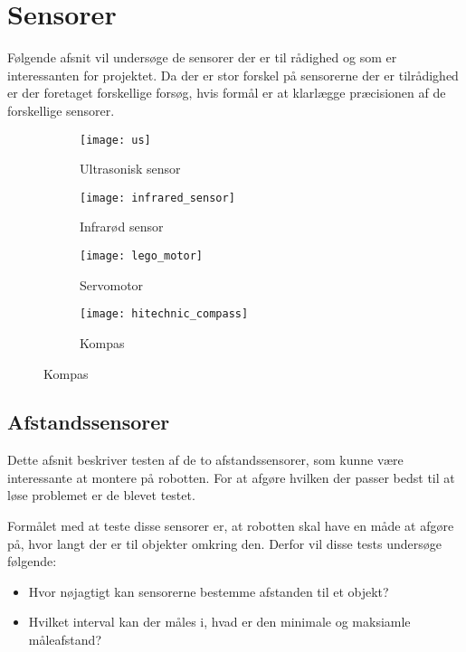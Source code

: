 \section{Sensorer}
Følgende afsnit vil undersøge de sensorer der er til rådighed og som er interessanten for projektet.
Da der er stor forskel på sensorerne der er tilrådighed er der foretaget forskellige forsøg, hvis formål er at klarlægge præcisionen af de forskellige sensorer.

\begin{figure}[h]
\centering
\begin{subfigure}[b]{.4\textwidth}
\centering
\texttt{[image: us]}
\caption{Ultrasonisk sensor}
\label{sensor:ultrasonic_sensor}
\end{subfigure}
\begin{subfigure}[b]{.4\textwidth}
\centering
\texttt{[image: infrared\_sensor]}
\caption{Infrarød sensor}
\label{sensor:infraroed_sensor}
\end{subfigure}
\begin{subfigure}[b]{.4\textwidth}
\centering
\texttt{[image: lego\_motor]}
\caption{Servomotor}
\label{sensor:servo_motor}
\end{subfigure}
\begin{subfigure}[b]{.4\textwidth}
\centering
\texttt{[image: hitechnic\_compass]}
\caption{Kompas}
\label{sensor:compass}
\end{subfigure}
\end{figure}

\subsection{Afstandssensorer}
Dette afsnit beskriver testen af de to afstandssensorer, som kunne være interessante at montere på robotten.
For at afgøre hvilken der passer bedst til at løse problemet er de blevet testet.

Formålet med at teste disse sensorer er, at robotten skal have en måde at afgøre på, hvor langt der er til objekter omkring den.
Derfor vil disse tests undersøge følgende:
\begin{itemize}
\item Hvor nøjagtigt kan sensorerne bestemme afstanden til et objekt?
\item Hvilket interval kan der måles i, hvad er den minimale og maksiamle måleafstand?
\end{itemize}

